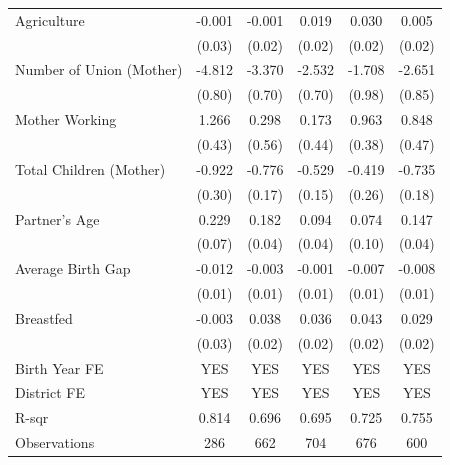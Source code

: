 \begin{longtable}{l*{5}{c}}
\hspace{1em}Agriculture & -0.001 & -0.001 & 0.019 & 0.030 & 0.005 \\
                    & (0.03) & (0.02) & (0.02) & (0.02) & (0.02) \\
Number of Union (Mother) & -4.812\sym{***} & -3.370\sym{***} & -2.532\sym{***} & -1.708\sym{*} & -2.651\sym{***} \\
                    & (0.80) & (0.70) & (0.70) & (0.98) & (0.85) \\
Mother Working & 1.266\sym{***} & 0.298 & 0.173 & 0.963\sym{**} & 0.848\sym{*} \\
                    & (0.43) & (0.56) & (0.44) & (0.38) & (0.47) \\
Total Children (Mother) & -0.922\sym{***} & -0.776\sym{***} & -0.529\sym{***} & -0.419 & -0.735\sym{***} \\
                    & (0.30) & (0.17) & (0.15) & (0.26) & (0.18) \\
Partner's Age & 0.229\sym{***} & 0.182\sym{***} & 0.094\sym{**} & 0.074 & 0.147\sym{***} \\
                    & (0.07) & (0.04) & (0.04) & (0.10) & (0.04) \\
Average Birth Gap & -0.012 & -0.003 & -0.001 & -0.007 & -0.008 \\
                    & (0.01) & (0.01) & (0.01) & (0.01) & (0.01) \\
Breastfed & -0.003 & 0.038 & 0.036 & 0.043\sym{*} & 0.029 \\
                    & (0.03) & (0.02) & (0.02) & (0.02) & (0.02) \\
\hline
Birth Year FE & YES & YES & YES & YES & YES \\
District FE & YES & YES & YES & YES & YES \\
R-sqr & 0.814 & 0.696 & 0.695 & 0.725 & 0.755 \\
Observations & 286 & 662 & 704 & 676 & 600 \\
\hline\hline
\end{longtable}